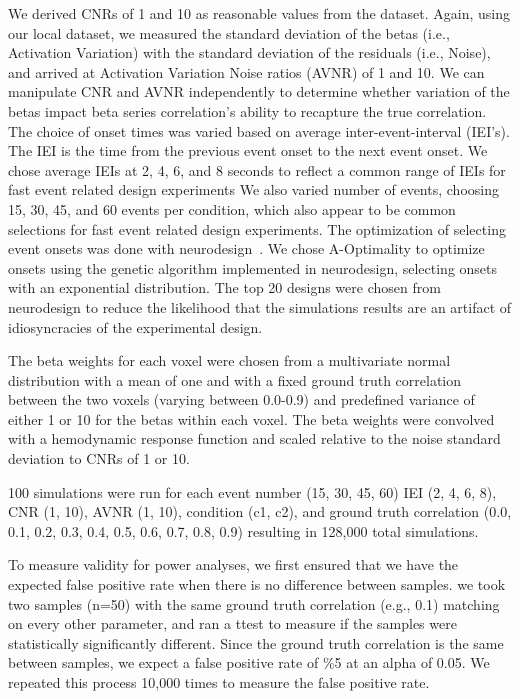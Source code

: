\documentclass[10pt,letterpaper]{article}
\begin{document}
We derived CNRs of 1 and 10 as reasonable values from the dataset.
Again, using our local dataset, we measured the standard deviation of the betas
(i.e., Activation Variation) with
the standard deviation of the residuals (i.e., Noise),
and arrived at Activation Variation Noise ratios (AVNR) of 1 and 10.
We can manipulate CNR and AVNR independently to determine whether variation of the betas
impact beta series correlation's ability to recapture the true correlation.
The choice of onset times was varied based on average inter-event-interval (IEI's).
The IEI is the time from the previous event onset to the next event onset.
We chose average IEIs at 2, 4, 6, and 8 seconds to reflect a common range of IEIs
for fast event related design experiments
We also varied number of events, choosing 15, 30, 45, and 60 events per condition,
which also appear to be common selections for fast event related design experiments.
The optimization of selecting event onsets was done with neurodesign~\cite{Durnez2018}.
We chose A-Optimality to optimize onsets using the genetic algorithm implemented
in neurodesign, selecting onsets with an exponential distribution.
The top 20 designs were chosen from neurodesign to reduce the likelihood
that the simulations results are an artifact of idiosyncracies of the experimental design.

The beta weights for each voxel were chosen from a multivariate normal distribution
with a mean of one and with a fixed ground truth correlation between the two voxels 
(varying between 0.0-0.9) and predefined variance of either 1 or 10
for the betas within each voxel.
The beta weights were convolved with a hemodynamic response function and scaled
relative to the noise standard deviation to CNRs of 1 or 10.

100 simulations were run for each event number (15, 30, 45, 60) IEI (2, 4, 6, 8), 
CNR (1, 10), AVNR (1, 10), condition (c1, c2), and ground truth correlation
(0.0, 0.1, 0.2, 0.3, 0.4, 0.5, 0.6, 0.7, 0.8, 0.9)
resulting in 128,000 total simulations.

To measure validity for power analyses, we first ensured that we have
the expected false positive rate when there is no difference between samples.
we took two samples (n=50) with the same ground truth correlation (e.g., 0.1)
matching on every other parameter, and ran a ttest to measure if the samples
were statistically significantly different.
Since the ground truth correlation is the same between samples,
we expect a false positive rate of \%5 at an alpha of 0.05.
We repeated this process 10,000 times to measure the false positive rate.
\end{document}
